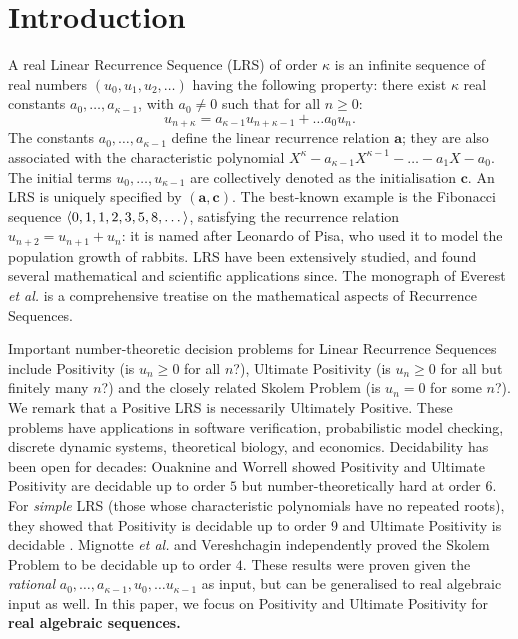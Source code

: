 \section{Introduction}
\label{section:intro}
A real Linear Recurrence Sequence (LRS) of order $\kappa$ is an infinite sequence of real numbers $(u_0, u_1, u_2, \dots)$ having the following property: there exist $\kappa$ real constants $a_{0}, \dots, a_{\kappa-1}$, with $a_0 \ne 0$ such that for all $n \ge 0$:
\begin{equation}
u_{n+\kappa} = a_{\kappa-1}u_{n+\kappa-1} + \dots a_0 u_n.
\end{equation}
The constants $a_0, \dots, a_{\kappa-1}$ define the linear recurrence relation $\mathbf{a}$; they are also associated with the characteristic polynomial
$
X^\kappa - a_{\kappa-1}X^{\kappa-1} - \dots - a_1X - a_0.
$ 
The initial terms $u_0, \dots, u_{\kappa-1}$ are collectively denoted as the initialisation $\mathbf{c}$. An LRS is uniquely specified by $(\mathbf{a}, \mathbf{c})$. The best-known example is the Fibonacci sequence $\langle0, 1, 1, 2, 3, 5, 8, \dots\rangle$, satisfying the recurrence relation $u_{n+2} = u_{n+1} + u_n$: it is named after Leonardo of Pisa, who used it to model the population growth of rabbits. LRS have been extensively studied, and found several mathematical and scientific applications since. The monograph of Everest \textit{et al.} \cite{Everest2003RecurrenceS} is a comprehensive treatise on the mathematical aspects of Recurrence Sequences.

Important number-theoretic decision problems for Linear Recurrence Sequences include Positivity (is $u_n \ge 0$ for all $n$?), Ultimate Positivity (is $u_n \ge 0$ for all but finitely many $n$?) and the closely related Skolem Problem (is $u_n = 0$ for some $n$?). We remark that a Positive LRS is necessarily Ultimately Positive. These problems have applications in software verification, probabilistic model checking, discrete dynamic systems, theoretical biology, and economics. Decidability has been open for decades: Ouaknine and Worrell \cite{joeljames3} showed Positivity and Ultimate Positivity are decidable up to order $5$ but number-theoretically hard at order $6$. For \textit{simple} LRS (those whose characteristic polynomials have no repeated roots), they showed that Positivity is decidable up to order $9$ \cite{ouaknine2014positivity} and Ultimate Positivity is decidable \cite{ouaknine2014ultimate}. Mignotte \textit{et al.} \cite{mignotte} and Vereshchagin \cite{vereshchagin} independently proved the Skolem Problem to be decidable up to order $4$. These results were proven given the \textit{rational} $a_0, \dots, a_{\kappa-1}, u_0, \dots u_{\kappa-1}$ as input, but can be generalised to real algebraic input as well. In this paper, we focus on Positivity and Ultimate Positivity for \textbf{real algebraic sequences.}

